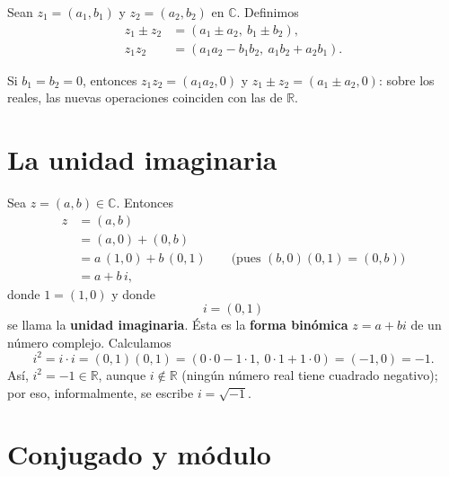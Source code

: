 \documentclass[12pt,a4paper]{book}
\begin{document}
  \begin{definicion}
    Sean $z_1=(a_1,b_1)$ y $z_2=(a_2,b_2)$ en $\mathbb{C}$. Definimos
    \begin{align*}
      z_1\pm z_2 & = (a_1\pm a_2,\ b_1\pm b_2),                        \\
      z_1z_2     & = (a_1a_2-b_1b_2,\ a_1b_2+a_2b_1).
    \end{align*}
  \end{definicion}

  Si $b_1=b_2=0$, entonces $z_1z_2=(a_1a_2,0)$ y $z_1\pm z_2=(a_1\pm a_2,0)$: sobre los reales, las nuevas operaciones coinciden con las de $\mathbb{R}$.

  \section{La unidad imaginaria}

  Sea $z=(a,b)\in\mathbb{C}$. Entonces
  \begin{align*}
    z & = (a,b)                                                             \\
      & = (a,0)+(0,b)                                                       \\
      & = a\,(1,0)+b\,(0,1) \qquad \text{(pues $(b,0)(0,1)=(0,b)$)} \\
      & = a+b\,i,
  \end{align*}
  donde $1=(1,0)$ y donde
  \begin{equation*}
    i=(0,1)
  \end{equation*}
  se llama la \textbf{unidad imaginaria}. Ésta es la \textbf{forma binómica} $z=a+bi$ de un número complejo. Calculamos
  \begin{equation*}
    i^2=i\cdot i=(0,1)(0,1)=(0\cdot 0-1\cdot 1,\ 0\cdot 1+1\cdot 0)=(-1,0)=-1.
  \end{equation*}
  Así, $i^2=-1\in\mathbb{R}$, aunque $i\notin\mathbb{R}$ (ningún número real tiene cuadrado negativo); por eso, informalmente, se escribe $i=\sqrt{-1}$.

  \section{Conjugado y módulo}
\end{document}

